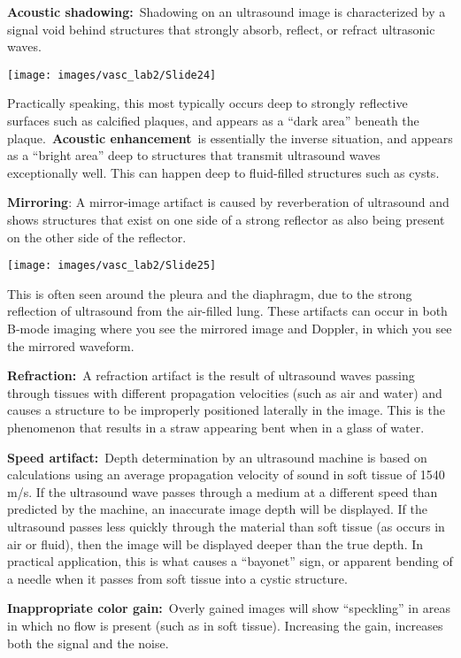 \documentclass[
]{book}
\begin{document}
\textbf{Acoustic shadowing:}~Shadowing on an ultrasound image is
characterized by a signal void behind structures that strongly absorb,
reflect, or refract ultrasonic waves.

\texttt{[image: images/vasc\_lab2/Slide24]}

Practically speaking, this most typically occurs deep to strongly
reflective surfaces such as calcified plaques, and appears as a ``dark
area'' beneath the plaque.~\textbf{Acoustic enhancement}~is essentially the
inverse situation, and appears as a ``bright area'' deep to structures
that transmit ultrasound waves exceptionally well. This can happen deep
to fluid-filled structures such as cysts.

\textbf{Mirroring}: A mirror-image artifact is caused by reverberation of
ultrasound and shows structures that exist on one side of a strong
reflector as also being present on the other side of the reflector.

\texttt{[image: images/vasc\_lab2/Slide25]}

This is often seen around the pleura and the diaphragm, due to the
strong reflection of ultrasound from the air-filled lung. These
artifacts can occur in both B-mode imaging where you see the mirrored
image and Doppler, in which you see the mirrored waveform.

\textbf{Refraction:}~A refraction artifact is the result of ultrasound waves
passing through tissues with different propagation velocities (such as
air and water) and causes a structure to be improperly positioned
laterally in the image. This is the phenomenon that results in a straw
appearing bent when in a glass of water.

\textbf{Speed artifact:}~Depth determination by an ultrasound machine is
based on calculations using an average propagation velocity of sound in
soft tissue of 1540 m/s. If the ultrasound wave passes through a medium
at a different speed than predicted by the machine, an inaccurate image
depth will be displayed. If the ultrasound passes less quickly through
the material than soft tissue (as occurs in air or fluid), then the
image will be displayed deeper than the true depth. In practical
application, this is what causes a ``bayonet'' sign, or apparent bending
of a needle when it passes from soft tissue into a cystic structure.

\textbf{Inappropriate color gain:}~Overly gained images will show ``speckling''
in areas in which no flow is present (such as in soft tissue).
Increasing the gain, increases both the signal and the
noise.\citep{kremkau2021}
\end{document}
